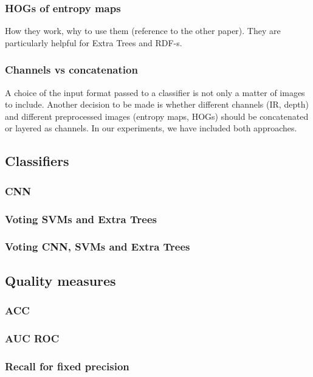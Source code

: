         \subsubsection*{HOGs of entropy maps}
        How they work, why to use them (reference to the other paper). They
        are particularly helpful for Extra Trees and RDF-s.

        \subsubsection*{Channels vs concatenation}
        A choice of the input format passed to a classifier is not only a matter
        of images to include. Another decision to be made is whether different
        channels (IR, depth) and different preprocessed images (entropy maps,
        HOGs) should be concatenated or layered as channels. In our experiments,
        we have included both approaches.


    \subsection{Classifiers}
        \subsubsection*{CNN}

        \subsubsection*{Voting SVMs and Extra Trees}

        \subsubsection*{Voting CNN, SVMs and Extra Trees}

    \subsection{Quality measures}
        \subsubsection*{ACC}

        \subsubsection*{AUC ROC}

        \subsubsection*{Recall for fixed precision}


